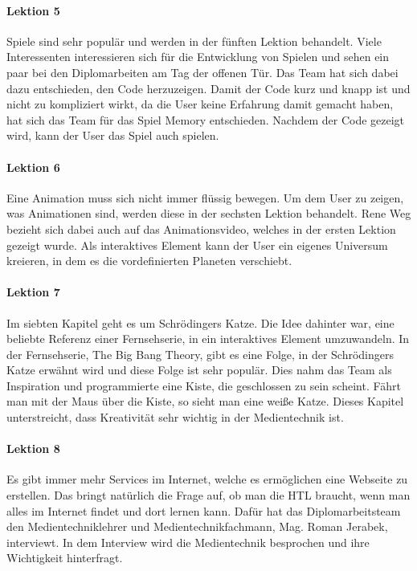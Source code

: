 \paragraph{Lektion 5}
Spiele sind sehr populär und werden in der fünften Lektion behandelt. Viele Interessenten interessieren sich für die Entwicklung von Spielen und sehen ein paar bei den Diplomarbeiten am Tag der offenen Tür. Das Team hat sich dabei dazu entschieden, den Code herzuzeigen. Damit der Code kurz und knapp ist und nicht zu kompliziert wirkt, da die User keine Erfahrung damit gemacht haben, hat sich das Team für das Spiel Memory entschieden. Nachdem der Code gezeigt wird, kann der User das Spiel auch spielen.

\paragraph{Lektion 6}
Eine Animation muss sich nicht immer flüssig bewegen. Um dem User zu zeigen, was Animationen sind, werden diese in der sechsten Lektion behandelt. Rene Weg bezieht sich dabei auch auf das Animationsvideo, welches in der ersten Lektion gezeigt wurde. Als interaktives Element kann der User ein eigenes Universum kreieren, in dem es die vordefinierten Planeten verschiebt. 

\paragraph{Lektion 7}
Im siebten Kapitel geht es um Schrödingers Katze. Die Idee dahinter war, eine beliebte Referenz einer Fernsehserie, in ein interaktives Element umzuwandeln. In der Fernsehserie, The Big Bang Theory, gibt es eine Folge, in der Schrödingers Katze erwähnt wird und diese Folge ist sehr populär. Dies nahm das Team als Inspiration und programmierte eine Kiste, die geschlossen zu sein scheint. Fährt man mit der Maus über die Kiste, so sieht man eine weiße Katze. Dieses Kapitel unterstreicht, dass Kreativität sehr wichtig in der Medientechnik ist.

\paragraph{Lektion 8}
Es gibt immer mehr Services im Internet, welche es ermöglichen eine Webseite zu erstellen. Das bringt natürlich die Frage auf, ob man die HTL braucht, wenn man alles im Internet findet und dort lernen kann. Dafür hat das Diplomarbeitsteam den Medientechniklehrer und Medientechnikfachmann, Mag. Roman Jerabek, interviewt. In dem Interview wird die Medientechnik besprochen und ihre Wichtigkeit hinterfragt.

